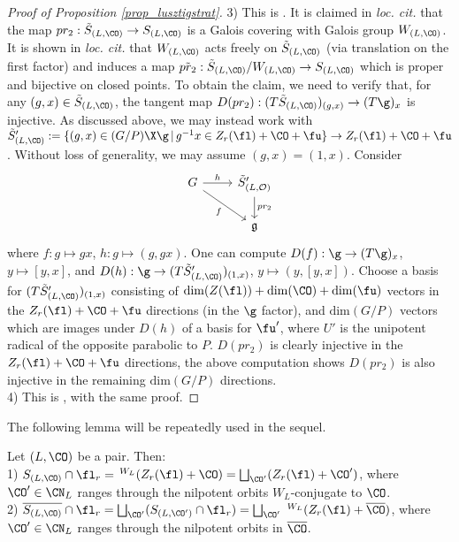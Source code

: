 \begin{proof}[Proof of Proposition \ref{prop_lusztigstrat}]
    3) This is \cite[.28]{letellier_fourier_2005}. It is claimed in \textit{loc. cit.} that the map $pr_2: \Tilde{S}_{(L,\CO)}\rightarrow S_{(L,\CO)}$ is a Galois covering with Galois group $W_{(L,\CO)}$. It is shown in \textit{loc. cit.} that $W_{(L,\CO)}$ acts freely on $\Tilde{S}_{(L,\CO)}$ (via translation on the first factor) and induces a map $\Tilde{pr_2}: \Tilde{S}_{(L,\CO)}/W_{(L,\CO)}\rightarrow S_{(L,\CO)}$ which is proper and bijective on closed points. To obtain the claim, we need to verify that, for any $(g,x)\in \Tilde{S}_{(L,\CO)}$, the tangent map $D(pr_2): (T\Tilde{S}_{(L,\CO)})_{(g,x)}\rightarrow (T\g)_x$ is injective. As discussed above, we may instead work with $\Tilde{S}'_{(L,\CO)}:=\{(g,x)\in (G/P)\X \g\,|\, g^{-1}x\in Z_r(\fl)+\CO+\fu\}\rightarrow Z_r(\fl)+\CO+\fu$. Without loss of generality, we may assume $(g,x)=(1,x)$. Consider  
\[\begin{tikzcd}
	G & {\tilde{S}'_{(L,\mathcal{O})}} \\
	& {\mathfrak{g}}
	\arrow["{pr_2}", from=1-2, to=2-2]
	\arrow["h", from=1-1, to=1-2]
	\arrow["f"', from=1-1, to=2-2]
\end{tikzcd}\]
where $f: g\mapsto gx$, $h: g\mapsto (g,gx)$. One can compute $D(f): \g\rightarrow(T\g)_x$, $y\mapsto [y,x]$, and $D(h): \g\rightarrow(T\Tilde{S}'_{(L,\CO)})_{(1,x)}$, $y\mapsto (y,[y,x])$. Choose a basis for $(T\Tilde{S}'_{(L,\CO)})_{(1,x)}$ consisting of $\mathrm{dim}(Z(\fl))+\mathrm{dim}(\CO)+\mathrm{dim}(\fu)$ vectors in the $Z_r(\fl)+\CO+\fu$ directions (in the $\g$ factor), and $\mathrm{dim}(G/P)$ vectors which are images under $D(h)$ of a basis for $\fu'$, where $U'$ is the unipotent radical of the opposite parabolic to $P$. $D(pr_2)$ is clearly injective in the $Z_r(\fl)+\CO+\fu$ directions, the above computation shows $D(pr_2)$ is also injective in the remaining $\mathrm{dim}(G/P)$ directions.\\

4) This is \cite[]{lusztig_cuspidal_1995}, with the same proof.

\end{proof}

The following lemma will be repeatedly used in the sequel.

\begin{lemma}\label{lem_intersect_lusz_strat}
    Let $(L,\CO)$ be a pair. Then:\\
    1) $S_{(L,\CO)}\cap\fl_r=$ $^{W_L}(Z_r(\fl)+\CO)=\bigsqcup_{\CO'}(Z_r(\fl)+\CO')$, where $\CO'\in\CN_L$ ranges through the nilpotent orbits $W_L$-conjugate to $\CO$.\\
    2) $\overline{S_{(L,\CO)}}\cap \fl_r=\bigsqcup_{\CO'}(S_{(L,\CO')}\cap\fl_r)=\bigsqcup_{\CO'}$ $^{W_L}(Z_r(\fl)+\overline{\CO})$, where $\CO'\in\CN_L$ ranges through the nilpotent orbits in $\overline{\CO}$.
\end{lemma}

